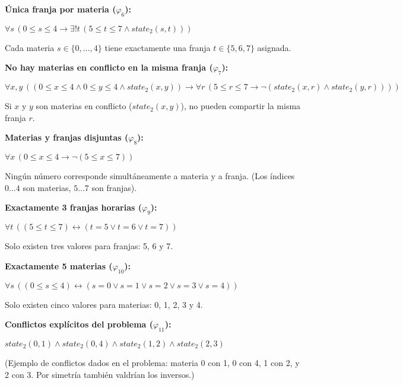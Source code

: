 \documentclass[a4paper,11pt]{article}
\begin{document}
\item \textbf{Única franja por materia ($\varphi_6$):}
\begin{center}
    $\forall s \, (0 \leq s \leq 4 \rightarrow \exists ! t \, (5 \leq t \leq 7 \land state_2(s,t)))$
\end{center}
Cada materia $s \in \{0, \dots, 4\}$ tiene exactamente una franja $t \in \{5, 6, 7\}$ asignada.

\item \textbf{No hay materias en conflicto en la misma franja ($\varphi_7$):}
\begin{center}
    $\forall x,y \, ((0 \leq x \leq 4 \land 0 \leq y \leq 4 \land state_2(x,y)) \rightarrow \forall r \, (5 \leq r \leq 7 \rightarrow \neg (state_2(x,r) \land state_2(y,r))))$
\end{center}
Si $x$ y $y$ son materias en conflicto ($state_2(x,y)$), no pueden compartir la misma franja $r$.

\item \textbf{Materias y franjas disjuntas ($\varphi_8$):}
\begin{center}
    $\forall x \, (0 \leq x \leq 4 \rightarrow \neg (5 \leq x \leq 7))$
\end{center}
Ningún número corresponde simultáneamente a materia y a franja. (Los índices $0 \dots 4$ son materias, $5 \dots 7$ son franjas).

\item \textbf{Exactamente 3 franjas horarias ($\varphi_9$):}
\begin{center}
    $\forall t \, ((5 \leq t \leq 7) \leftrightarrow (t = 5 \lor t = 6 \lor t = 7))$
\end{center}
Solo existen tres valores para franjas: 5, 6 y 7.

\item \textbf{Exactamente 5 materias ($\varphi_{10}$):}
\begin{center}
    $\forall s \, ((0 \leq s \leq 4) \leftrightarrow (s = 0 \lor s = 1 \lor s = 2 \lor s = 3 \lor s = 4))$
\end{center}
Solo existen cinco valores para materias: 0, 1, 2, 3 y 4.

\item \textbf{Conflictos explícitos del problema ($\varphi_{11}$):}
\begin{center}
    $state_2(0,1) \land state_2(0,4) \land state_2(1,2) \land state_2(2,3)$
\end{center}
(Ejemplo de conflictos dados en el problema: materia 0 con 1, 0 con 4, 1 con 2, y 2 con 3. Por simetría también valdrían los inversos.)
\end{document}
